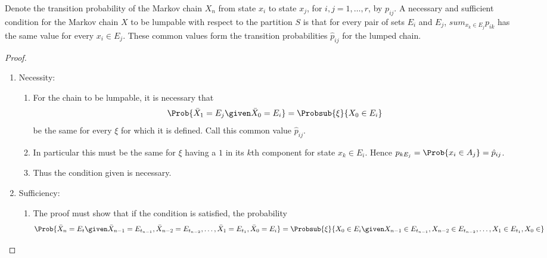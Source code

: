 \documentclass[12pt]{article}
\begin{document}
\begin{theorem}
    Denote the transition probability of the Markov chain \( X_n \) from
    state \( x_i \) to state \( x_j \), for \( i, j = 1, \dots, r \), by
    \( p_{ij} \).  A necessary and sufficient condition for the Markov
    chain \( X \) to be lumpable with respect to the partition \( S \)
    is that for every pair of sets \( E_i \) and \( E_j \), \( sum_{x_k
    \in E_j} p_{ik} \) has the same value for every \( x_i \in E_j \).
    These common values form the transition probabilities \( \hat{p}_{ij}
    \) for the lumped chain.
\end{theorem}

\begin{proof}
    \begin{enumerate}
        \item
            Necessity:
            \begin{enumerate}
                \item
                    For the chain to be lumpable, it is necessary that
                    \[
                        \Prob{\bar{X}_1 = E_j \given \bar{X}_0 = E_i} =
                        \Probsub{\xi}{X_0 \in E_i }
                    \] be the same for every \( \xi \) for which it is
                    defined.  Call this common value \( \hat{p}_{ij} \).
                \item
                    In particular this must be the same for \( \xi \)
                    having a \( 1 \) in its \( k \)th component for
                    state \( x_k \in E_i \). Hence \( p_{kE_j} = \Prob{x_i
                    \in A_j} = \hat{p}_{ij} \).
                \item
                    Thus the condition given is necessary.
            \end{enumerate}
        \item
            Sufficiency:
            \begin{enumerate}
                \item
                    The proof must show that if the condition is
                    satisfied, the probability
                    \[
                        \Prob{\bar{X}_n = E_t \given \bar{X}_{n-1} = E_{t_
                        {n-1}}, \bar{X}_{n-2} = E_{t_{n-2}}, \dots, \bar
                        {X}_1 = E_{t_1}, \bar{X}_0 = E_i} = \Probsub{\xi}
                        {X_0 \in E_i \given X_{n-1} \in E_{t_{n-1}}, X_{n-2}
                        \in E_{t_{n-2}}, \dots, X_1 \in E_{t_1}, X_0 \in
}\]
\end{enumerate}
\end{enumerate}
\end{proof}
\end{document}
